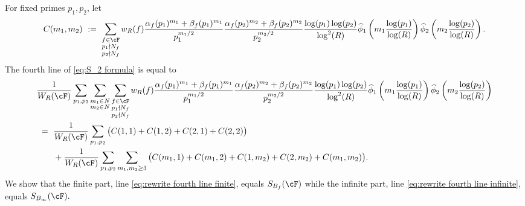 \documentclass[11pt, reqno]{amsart}
\theoremstyle{definition}
\theoremstyle{remark}
\numberwithin{equation}{section}
\renewcommand{\hat}{\widehat}
\begin{document}
For fixed primes $p_1,p_2$, let 
\footnotesize\begin{equation}\label{eq: breaking into C(i,j)'s 5.9}
    C(m_1,m_2)\ := \ \sum_{\substack{f\in \cF\\p_1\nmid N_f\\p_2\nmid N_f }}w_R(f)\frac{\alpha_f(p_1)^{m_1}+\beta_f(p_1)^{m_1}}{p_1^{m_1/2}} \frac{\alpha_f(p_2)^{m_2}+\beta_f(p_2)^{m_2}}{p_2^{m_2/2}}\frac{\log(p_1)\log (p_2)}{\log^2(R)}\hat\phi_1 \left(m_1 \frac{\log(p_1)}{\log(R)}\right)\hat \phi_2 \left(m_2 \frac{\log(p_2)}{\log(R)}\right).
\end{equation}\normalsize
The fourth line of \eqref{eq:S_2 formula} is equal to
\footnotesize \begin{align}\nonumber
  &  \frac{1}{W_R(\cF)}\sum_{p_1,p_2}\sum_{\substack{m_1\in N\\m_2\in N}}\sum_{\substack{f\in \cF\\p_1\nmid N_f\\p_2\nmid N_f }}w_R(f)\frac{\alpha_f(p_1)^{m_1}+\beta_f(p_1)^{m_1}}{p_1^{m_1/2}} \frac{\alpha_f(p_2)^{m_2}+\beta_f(p_2)^{m_2}}{p_2^{m_2/2}}\frac{\log(p_1)\log (p_2)}{\log^2(R)}\hat\phi_1 \left(m_1 \frac{\log(p_1)}{\log(R)}\right)\hat \phi_2 \left(m_2 \frac{\log(p_2)}{\log(R)}\right)\notag\\
&\ = \ \frac{1}{W_R(\cF)}\sum_{p_1,p_2}\big(C(1,1)+C(1,2)+C(2,1)+C(2,2)\big) \label{eq:rewrite fourth line finite}
\\ & ~~~~~\ +\frac{1}{W_R(\cF)}\sum_{p_1,p_2}\sum_{m_1,m_2\geq 3} \big(C(m_1,1)+C(m_1,2)+C(1,m_2)+C(2,m_2)+C(m_1,m_2)\big).\label{eq:rewrite fourth line infinite}
\end{align}
\normalsize
We show that the finite part, line \eqref{eq:rewrite fourth line finite}, equals $S_{B_f}(\cF)$ while the infinite part, line \eqref{eq:rewrite fourth line infinite}, equals $S_{B_\infty}(\cF).$
\end{document}
